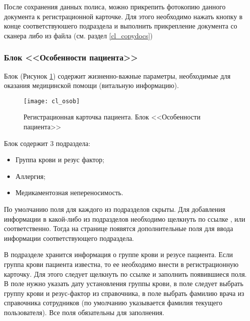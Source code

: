 {После сохранения данных полиса, можно прикрепить фотокопию данного документа к регистрационной карточке. Для этого необходимо нажать кнопку  в конце соответствуюшего подраздела и выполнить прикрепление документа со сканера либо из файла (см. раздел \ref{cl_copydocs})


\subsubsection{Блок <<Особенности пациента>>} 

Блок  (Рисунок \ref{img_cl_osob}) содержит жизненно-важные параметры, необходимые для оказания медицинской помощи (витальную информацию). 

\begin{figure}[!ht]\centering
 \texttt{[image: cl\_osob]}
 \caption{Регистрационная карточка пациента. Блок <<Особенности пациента>>}
 \label{img_cl_osob}
\end{figure} 

Блок содержит 3 подраздела: 
\begin{itemize}
 \item Группа крови и резус фактор;
 \item Аллергия;
 \item Медикаментозная непереносимость.
\end{itemize}

По умолчанию поля для каждого из подразделов скрыты. Для добавления информации в какой-либо из подразделов необходимо щелкнуть по ссылке ,  или  соответственно. Тогда на странице появятся дополнительные поля для ввода информации соответствующего подраздела.

В подразделе  хранится информация о группе крови  и резусе пациента. Если группа крови пациента известна, то ее необходимо внести в регистрационную карточку. Для этого следует щелкнуть по ссылке  и заполнить появившиеся поля. В поле  нужно указать дату установления группы крови, в поле  следует выбрать группу крови и резус-фактор из справочника, в поле  выбрать фамилию врача из справочника сотрудников (по умолчанию указывается фамилия текущего пользователя). Все поля обязательны для заполнения. 

}
